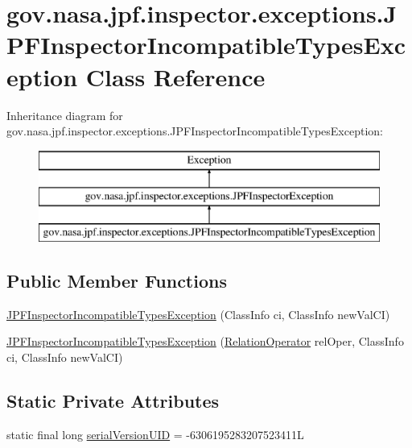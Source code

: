 \hypertarget{classgov_1_1nasa_1_1jpf_1_1inspector_1_1exceptions_1_1_j_p_f_inspector_incompatible_types_exception}{}\section{gov.\+nasa.\+jpf.\+inspector.\+exceptions.\+J\+P\+F\+Inspector\+Incompatible\+Types\+Exception Class Reference}
\label{classgov_1_1nasa_1_1jpf_1_1inspector_1_1exceptions_1_1_j_p_f_inspector_incompatible_types_exception}
Inheritance diagram for gov.\+nasa.\+jpf.\+inspector.\+exceptions.\+J\+P\+F\+Inspector\+Incompatible\+Types\+Exception\+:\begin{figure}[H]
\begin{center}
\leavevmode
\includegraphics[height=3.000000cm]{classgov_1_1nasa_1_1jpf_1_1inspector_1_1exceptions_1_1_j_p_f_inspector_incompatible_types_exception}
\end{center}
\end{figure}
\subsection*{Public Member Functions}
\begin{DoxyCompactItemize}
\item 
\hyperlink{classgov_1_1nasa_1_1jpf_1_1inspector_1_1exceptions_1_1_j_p_f_inspector_incompatible_types_exception_ab5f7ef1b7893b921fbb6b4e5e4fd8381}{J\+P\+F\+Inspector\+Incompatible\+Types\+Exception} (Class\+Info ci, Class\+Info new\+Val\+CI)
\item 
\hyperlink{classgov_1_1nasa_1_1jpf_1_1inspector_1_1exceptions_1_1_j_p_f_inspector_incompatible_types_exception_a943e02e614a3192c6e4a1143796fa761}{J\+P\+F\+Inspector\+Incompatible\+Types\+Exception} (\hyperlink{interfacegov_1_1nasa_1_1jpf_1_1inspector_1_1server_1_1programstate_1_1relop_1_1_relation_operator}{Relation\+Operator} rel\+Oper, Class\+Info ci, Class\+Info new\+Val\+CI)
\end{DoxyCompactItemize}
\subsection*{Static Private Attributes}
\begin{DoxyCompactItemize}
\item 
static final long \hyperlink{classgov_1_1nasa_1_1jpf_1_1inspector_1_1exceptions_1_1_j_p_f_inspector_incompatible_types_exception_aeef4b3bd4659af045c1160244ca9f21c}{serial\+Version\+U\+ID} = -\/6306195283207523411L
\end{DoxyCompactItemize}


